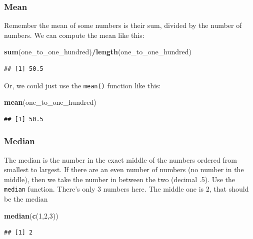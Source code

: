 \documentclass[]{book}
\newenvironment{Shaded}{\begin{snugshade}}{\end{snugshade}}
\newcommand{\KeywordTok}[1]{\textcolor[rgb]{0.13,0.29,0.53}{\textbf{#1}}}
\newcommand{\DecValTok}[1]{\textcolor[rgb]{0.00,0.00,0.81}{#1}}
\newcommand{\OperatorTok}[1]{\textcolor[rgb]{0.81,0.36,0.00}{\textbf{#1}}}
\newcommand{\NormalTok}[1]{#1}
\begin{document}
\subsubsection{Mean}\label{mean}

Remember the mean of some numbers is their sum, divided by the number of
numbers. We can compute the mean like this:

\begin{Shaded}
\begin{Highlighting}[]
\KeywordTok{sum}\NormalTok{(one_to_one_hundred)}\OperatorTok{/}\KeywordTok{length}\NormalTok{(one_to_one_hundred)}
\end{Highlighting}
\end{Shaded}

\begin{verbatim}
## [1] 50.5
\end{verbatim}

Or, we could just use the \texttt{mean()} function like this:

\begin{Shaded}
\begin{Highlighting}[]
\KeywordTok{mean}\NormalTok{(one_to_one_hundred)}
\end{Highlighting}
\end{Shaded}

\begin{verbatim}
## [1] 50.5
\end{verbatim}

\subsubsection{Median}\label{median}

The median is the number in the exact middle of the numbers ordered from
smallest to largest. If there are an even number of numbers (no number
in the middle), then we take the number in between the two (decimal .5).
Use the \texttt{median} function. There's only 3 numbers here. The
middle one is 2, that should be the median

\begin{Shaded}
\begin{Highlighting}[]
\KeywordTok{median}\NormalTok{(}\KeywordTok{c}\NormalTok{(}\DecValTok{1}\NormalTok{,}\DecValTok{2}\NormalTok{,}\DecValTok{3}\NormalTok{))}
\end{Highlighting}
\end{Shaded}

\begin{verbatim}
## [1] 2
\end{verbatim}
\end{document}
